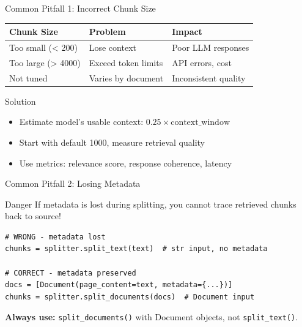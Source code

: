 \documentclass[aspectratio=169,11pt]{beamer}
\begin{document}
\begin{frame}{Common Pitfall 1: Incorrect Chunk Size}
  \begin{center}
    \begin{tabular}{lll}
      \toprule
      \textbf{Chunk Size} & \textbf{Problem} & \textbf{Impact} \\
      \midrule
      Too small (< 200) & Lose context & Poor LLM responses \\
      Too large (> 4000) & Exceed token limits & API errors, cost \\
      Not tuned & Varies by document & Inconsistent quality \\
      \bottomrule
    \end{tabular}
  \end{center}

  \vspace{1cm}
  \begin{warningbox}{Solution}
    \begin{itemize}
    \setlength{\itemsep}{1pt}
      \item Estimate model's usable context: $0.25 \times \text{context\_window}$
      \item Start with default 1000, measure retrieval quality
      \item Use metrics: relevance score, response coherence, latency
    \end{itemize}
  \end{warningbox}
\end{frame}

\begin{frame}[fragile]{Common Pitfall 2: Losing Metadata}
  \begin{warningbox}{Danger}
    If metadata is lost during splitting, you cannot trace retrieved chunks back to source!
  \end{warningbox}

  \vspace{0.5cm}
  \begin{lstlisting}
# WRONG - metadata lost
chunks = splitter.split_text(text)  # str input, no metadata

# CORRECT - metadata preserved
docs = [Document(page_content=text, metadata={...})]
chunks = splitter.split_documents(docs)  # Document input
  \end{lstlisting}

  \vspace{0.5cm}
  \textbf{Always use:} \texttt{split\_documents()} with Document objects, not \texttt{split\_text()}.
\end{frame}
\end{document}
